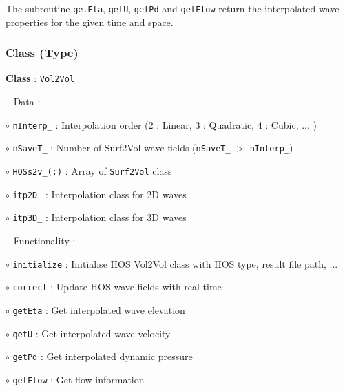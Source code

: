 	The subroutine \texttt{getEta}, \texttt{getU}, \texttt{getPd} and \texttt{getFlow} return the interpolated wave properties for the given time and space. 

	\subsubsection{Class (Type)}
	
	\textbf{Class} : \texttt{Vol2Vol}
	
	\hspace{0.5 cm} -- Data :
	
	\hspace{1.0 cm} $\circ$ \texttt{nInterp\_} : Interpolation order (2 : Linear, 3 : Quadratic, 4 : Cubic, ... )
	
	\hspace{1.0 cm} $\circ$ \texttt{nSaveT\_} : Number of Surf2Vol wave fields  (\texttt{nSaveT\_}  $>$ \texttt{nInterp\_})
	
	\hspace{1.0 cm} $\circ$ \texttt{HOSs2v\_(:)} : Array of \texttt{Surf2Vol} class
	
	\hspace{1.0 cm} $\circ$ \texttt{itp2D\_} : Interpolation class for 2D waves
	
	\hspace{1.0 cm} $\circ$ \texttt{itp3D\_} : Interpolation class for 3D waves
	
	\vspace{0.5cm}
	
	\hspace{0.5 cm} -- Functionality :
	
	\hspace{1.0 cm} $\circ$ \texttt{initialize} : Initialise HOS Vol2Vol class with HOS type, result file path, ...
	
	\hspace{1.0 cm} $\circ$ \texttt{correct} : Update HOS wave fields with real-time
	
	\hspace{1.0 cm} $\circ$ \texttt{getEta} : Get interpolated wave elevation 
	
	\hspace{1.0 cm} $\circ$ \texttt{getU} : Get interpolated wave velocity 
	
	\hspace{1.0 cm} $\circ$ \texttt{getPd} : Get interpolated dynamic pressure
	
	\hspace{1.0 cm} $\circ$ \texttt{getFlow} : Get flow information
	
